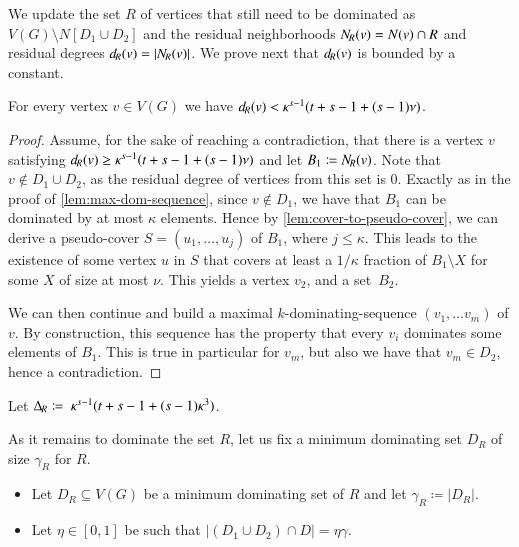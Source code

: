 We update the set $R$ of vertices that still need to be dominated
as $V(G)\setminus N[D_1\cup D_2]$
and the residual neighborhoods $N_{\hspace{-1pt}R}(v)= N(v)\cap R$
and residual degrees $d_{\hspace{-1pt}R}(v) =|N_{\hspace{-1pt}R}(v)|$. We
prove next that $d_{\hspace{-1pt}R}(v)$ is bounded by a constant.

\begin{lemma}\label{lem:smalldegree}
  For every vertex $v\in V(G)$ we have $d_{\hspace{-1pt}R}(v)< \kappa^{s-1}(t+s-1+(s-1)\nu)$.
\end{lemma}
\begin{proof}
  Assume, for the sake of reaching a contradiction, that there is a vertex $v$
  satisfying \linebreak$d_{\hspace{-1pt}R}(v)   \ge  \kappa^{s -1}(t+s -1+(s -1)\nu)$ and let $B_1\coloneqq N_{\hspace{-1pt}R}(v)$. Note that $v\not\in D_1\cup D_2$, as the residual degree of vertices from this
  set is $0$.
  Exactly as in the proof of \cref{lem:max-dom-sequence}, since $v\not\in D_1$,
  we have that $B_1$ can be dominated by at most $\kappa$ elements. Hence by
  \cref{lem:cover-to-pseudo-cover}, we can derive a
  pseudo-cover $S=(u_1,\ldots,u_j)$ of
  $B_1$, where $j\le \kappa$. This leads to the existence of some vertex $u$ in $S$
  that covers at least a $1/\kappa$ fraction of $B_1\setminus X$ for some $X$ of size
  at most $\nu$. This yields a
  vertex $v_2$, and a set~$B_2$.

  We can then continue and build a maximal $k$-dominating-sequence
  $(v_1,\ldots v_m)$ of $v$. By construction, this sequence has the property
  that every $v_i$ dominates some elements of $B_1$. This is true in particular
  for $v_m$, but also we have that $v_m\in D_2$, hence a contradiction.
\end{proof}


\begin{tcolorbox}
  Let $\Delta_{\hspace{-1pt}R}\coloneqq~\kappa^{s-1}(t+s-1+(s-1)\kappa^3)$.
\end{tcolorbox}

As it remains to dominate the set $R$, let us fix a minimum dominating
set $D_R$ of size $\gamma_R$ for $R$.

\smallskip
\begin{tcolorbox}
\begin{itemize}
\item Let $D_R\subseteq V(G)$ be a minimum dominating
  set of $R$ and let $\gamma_R\coloneqq |D_R|$.
\item Let $\eta\in [0,1]$ be such that $|(D_1 \cup D_2)\cap D| =\eta\gamma$.
\end{itemize}
\end{tcolorbox}

